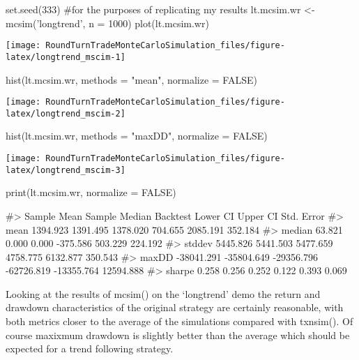 \begin{Schunk}
\begin{Sinput}
set.seed(333) #for the purposes of replicating my results
lt.mcsim.wr <- mcsim('longtrend', n = 1000)
plot(lt.mcsim.wr)
\end{Sinput}


\begin{center}\texttt{[image: RoundTurnTradeMonteCarloSimulation\_files/figure-latex/longtrend\_mscim-1]} \end{center}

\begin{Sinput}
hist(lt.mcsim.wr, methods = "mean", normalize = FALSE)
\end{Sinput}


\begin{center}\texttt{[image: RoundTurnTradeMonteCarloSimulation\_files/figure-latex/longtrend\_mscim-2]} \end{center}

\begin{Sinput}
hist(lt.mcsim.wr, methods = "maxDD", normalize = FALSE)
\end{Sinput}


\begin{center}\texttt{[image: RoundTurnTradeMonteCarloSimulation\_files/figure-latex/longtrend\_mscim-3]} \end{center}

\begin{Sinput}
print(lt.mcsim.wr, normalize = FALSE)
\end{Sinput}
\begin{Soutput}
#>        Sample Mean Sample Median   Backtest   Lower CI   Upper CI Std. Error
#> mean      1394.923      1391.495   1378.020    704.655   2085.191    352.184
#> median      63.821         0.000      0.000   -375.586    503.229    224.192
#> stddev    5445.826      5441.503   5477.659   4758.775   6132.877    350.543
#> maxDD   -38041.291    -35804.649 -29356.796 -62726.819 -13355.764  12594.888
#> sharpe       0.258         0.256      0.252      0.122      0.393      0.069
\end{Soutput}
\end{Schunk}

Looking at the results of mcsim() on the `longtrend' demo the return and
drawdown characteristics of the original strategy are certainly
reasonable, with both metrics closer to the average of the simulations
compared with txnsim(). Of course maxixmum drawdown is slightly better
than the average which should be expected for a trend following
strategy.

